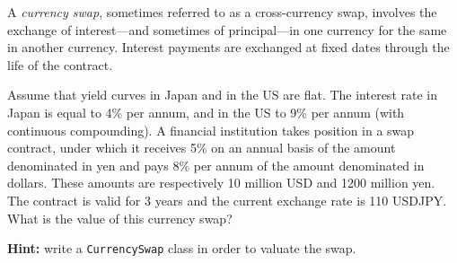 \begin{question}
A \emph{currency swap}, sometimes referred to as a cross-currency swap, involves the exchange of interest—and sometimes of principal—in one currency for the same in another currency. Interest payments are exchanged at fixed dates through the life of the contract. 

Assume that yield curves in Japan and in the US are flat. The interest rate in Japan is equal to 4\% per annum, and in the US to 9\% per annum (with continuous compounding). A financial institution takes position in a swap contract, under which it receives 5\% on an annual basis of the amount denominated in yen and pays 8\% per annum of the amount denominated in dollars. These amounts are respectively 10 million USD and 1200 million yen. The contract is valid for 3 years and the current exchange rate is 110 USDJPY. What is the value of this currency swap?

\textbf{Hint:} write a \texttt{CurrencySwap} class in order to valuate the swap.
\end{question}

